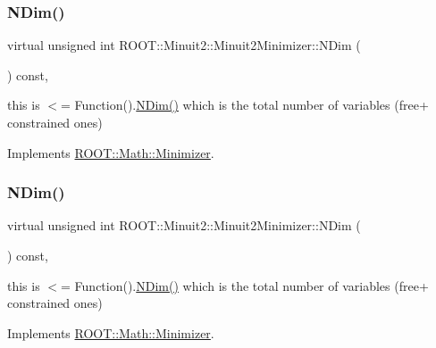 \subsubsection{\texorpdfstring{NDim()}{NDim()}\hspace{0.1cm}{\footnotesize\ttfamily [2/3]}}
{\footnotesize\ttfamily virtual unsigned int R\+O\+O\+T\+::\+Minuit2\+::\+Minuit2\+Minimizer\+::\+N\+Dim (\begin{DoxyParamCaption}{ }\end{DoxyParamCaption}) const\hspace{0.3cm}{\ttfamily [inline]}, {\ttfamily [virtual]}}

this is $<$= Function().\mbox{\hyperlink{classROOT_1_1Minuit2_1_1Minuit2Minimizer_a6ed2c7d99296e222f0f43295e302eb9e}{N\+Dim()}} which is the total number of variables (free+ constrained ones) 

Implements \mbox{\hyperlink{classROOT_1_1Math_1_1Minimizer_aecb9b9ee5c6a9fd7db3196ae3ac5e335}{R\+O\+O\+T\+::\+Math\+::\+Minimizer}}.

\mbox{\label{classROOT_1_1Minuit2_1_1Minuit2Minimizer_a6ed2c7d99296e222f0f43295e302eb9e}} 
\subsubsection{\texorpdfstring{NDim()}{NDim()}\hspace{0.1cm}{\footnotesize\ttfamily [3/3]}}
{\footnotesize\ttfamily virtual unsigned int R\+O\+O\+T\+::\+Minuit2\+::\+Minuit2\+Minimizer\+::\+N\+Dim (\begin{DoxyParamCaption}{ }\end{DoxyParamCaption}) const\hspace{0.3cm}{\ttfamily [inline]}, {\ttfamily [virtual]}}

this is $<$= Function().\mbox{\hyperlink{classROOT_1_1Minuit2_1_1Minuit2Minimizer_a6ed2c7d99296e222f0f43295e302eb9e}{N\+Dim()}} which is the total number of variables (free+ constrained ones) 

Implements \mbox{\hyperlink{classROOT_1_1Math_1_1Minimizer_aecb9b9ee5c6a9fd7db3196ae3ac5e335}{R\+O\+O\+T\+::\+Math\+::\+Minimizer}}.

\mbox{\label{classROOT_1_1Minuit2_1_1Minuit2Minimizer_a0aa136c5a94d1e5c6bfcbfb98da7ad2d}} 
